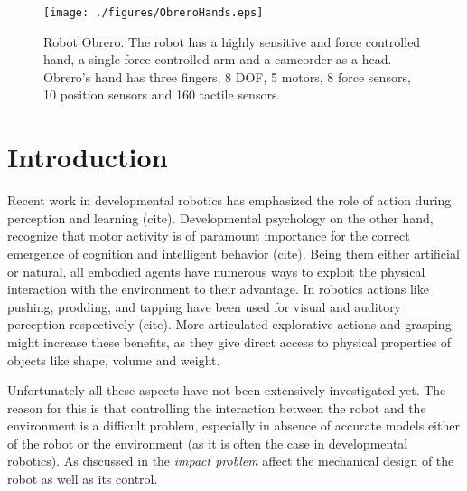 \begin{figure}[tbp]
\centerline{
\texttt{[image: ./figures/ObreroHands.eps]}
} \caption{Robot Obrero. The robot has a highly sensitive and
force controlled hand, a single force controlled arm and a
camcorder as a head. Obrero's hand  has three fingers, 8 DOF, 5
motors, 8 force sensors, 10 position sensors and 160 tactile
sensors.} \label{fig:RobotObrero}
\end{figure}

\section{Introduction}

Recent work in developmental robotics has emphasized the role of
action during perception and learning (cite). Developmental
psychology on the other hand, recognize that motor activity is of
paramount importance for the correct emergence of cognition and
intelligent behavior (cite). Being them either artificial or
natural, all embodied agents have numerous ways to exploit the
physical interaction with the environment to their advantage. In
robotics actions like pushing, prodding, and tapping have been
used for visual and auditory perception respectively
(cite)\cite{etorresjara05tapping}. More articulated explorative
actions and grasping might increase these benefits, as they give
direct access to physical properties of objects like shape, volume
and weight.


Unfortunately all these aspects have not been extensively investigated yet. The
reason for this is that controlling the interaction between the robot and
the environment is a difficult problem, especially in absence of accurate
models either of the robot or the environment (as it is often the case in
developmental robotics). As discussed in \cite{volpe90real} the
\emph{impact problem} affect the mechanical design of the robot as well as
its control.

